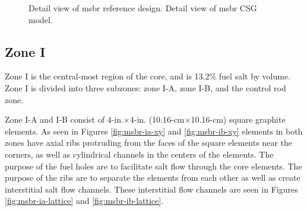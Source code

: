 \begin{figure}[htpb]
    \centering
    \caption[Detail views of MSBR core region]{
         Detail view of \Gls{msbr} reference design.
         Detail view of \Gls{msbr} CSG model.}

    \label{fig:msbr-detail}
\end{figure}

\subsection{Zone I} Zone I is the central-most region of the core, and is 13.2\%
fuel salt by volume. Zone I is divided into three subzones: zone I-A, zone I-B,
and the control rod zone.

Zone I-A and I-B consist of 4-in.$\times$4-in. (10.16-cm$\times$10.16-cm)
square graphite elements. As seen in Figures \ref{fig:msbr-ia-xy} and
\ref{fig:msbr-ib-xy} elements in both zones have axial ribs protruding from
the faces of the square elements near the corners, as well as cylindrical
channels in the centers of the elements. The purpose of the fuel holes are to
facilitate salt flow through the core elements. The purpose of the ribs are to
separate the elements from each other as well as create interstitial salt flow
channels\cite{robertson_conceptual_1971}. These interstitial flow channels
are seen in Figures \ref{fig:msbr-ia-lattice} and \ref{fig:msbr-ib-lattice}.

